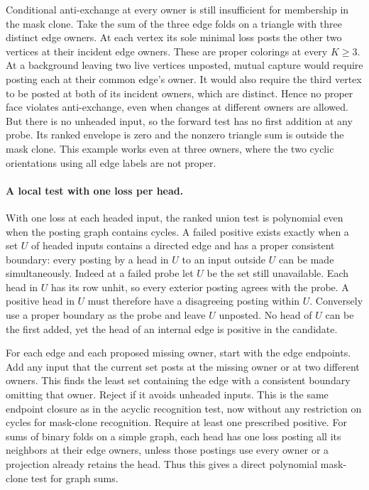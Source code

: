Conditional anti-exchange at every owner is still insufficient
for membership in the mask clone. Take the sum of the three
edge folds on a triangle with three distinct edge owners.
At each vertex its sole minimal loss posts the other two
vertices at their incident edge owners. These are proper
colorings at every $K\ge3$. At a background leaving two live
vertices unposted, mutual capture would require posting
each at their common edge's owner. It would also require the
third vertex to be posted at both of its incident owners,
which are distinct. Hence no proper face violates
anti-exchange, even when changes at different owners are
allowed. But there is no unheaded input, so the forward
test has no first addition at any probe. Its ranked envelope
is zero and the nonzero triangle sum is outside the mask
clone. This example works even at three owners, where the
two cyclic orientations using all edge labels are not proper.

\paragraph{A local test with one loss per head.}
With one loss at each headed input, the ranked union test
is polynomial even when the posting graph contains cycles.
A failed positive exists exactly when a set $U$ of headed
inputs contains a directed edge and has a proper consistent
boundary: every posting by a head in $U$ to an input
outside $U$ can be made simultaneously. Indeed at a failed
probe let $U$ be the set still unavailable. Each head in
$U$ has its row unhit, so every exterior posting agrees
with the probe. A positive head in $U$ must therefore
have a disagreeing posting within $U$. Conversely use a
proper boundary as the probe and leave $U$ unposted.
No head of $U$ can be the first added, yet the head of
an internal edge is positive in the candidate.

For each edge and each proposed missing owner, start
with the edge endpoints. Add any input that the current
set posts at the missing owner or at two different owners.
This finds the least set containing the edge with a
consistent boundary omitting that owner. Reject if it
avoids unheaded inputs. This is the same endpoint
closure as in the acyclic recognition test, now without
any restriction on cycles for mask-clone recognition.
Require at least one prescribed positive.
For sums of binary folds on a simple graph, each head
has one loss posting all its neighbors at their edge
owners, unless those postings use every owner or a
projection already retains the head. Thus this gives
a direct polynomial mask-clone test for graph sums.

